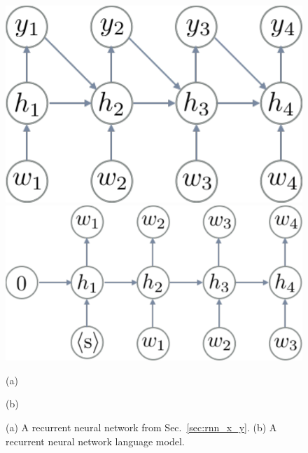 \documentclass{report}
\begin{document}
\begin{figure}[t]
    \centering
    \begin{minipage}{0.44\textwidth}
        \centering
        \includegraphics[width=0.95\columnwidth]{figures/rnn_same_length.pdf}
    \end{minipage}
    \hfill
    \begin{minipage}{0.55\textwidth}
        \centering
        \includegraphics[width=0.95\columnwidth]{figures/rnn_lm.pdf}
    \end{minipage}

    \begin{minipage}{0.44\textwidth}
        \centering
        (a)
    \end{minipage}
    \hfill
    \begin{minipage}{0.55\textwidth}
        \centering
        (b)
    \end{minipage}

    \caption{
        (a) A recurrent neural network from Sec.~\ref{sec:rnn_x_y}. (b) A
        recurrent neural network language model.
    }
    \label{fig:rnn_lm}
\end{figure}
\end{document}
